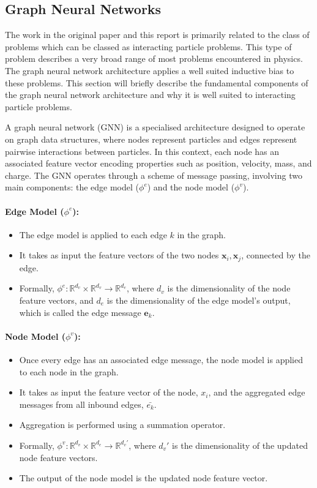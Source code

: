 \documentclass[11pt]{article}
\begin{document}
\subsection{Graph Neural Networks}
The work in the original paper and this report is primarily related to the class of problems which can be classed as interacting particle problems. This type of problem describes a very broad range of most problems encountered in physics. The graph neural network architecture applies a well suited inductive bias to these problems. This section will briefly describe the fundamental components of the graph neural network architecture and why it is well suited to interacting particle problems.

A graph neural network (GNN) is a specialised architecture designed to operate on graph data structures, where nodes represent particles and edges represent pairwise interactions between particles. In this context, each node has an associated feature vector encoding properties such as position, velocity, mass, and charge. The GNN operates through a scheme of message passing, involving two main components: the edge model ($\phi^e$) and the node model ($\phi^v$).
\paragraph*{Edge Model ($\phi^e$):}
   \begin{itemize}
       \item The edge model is applied to each edge $k$ in the graph.
       \item It takes as input the feature vectors of the two nodes $\mathbf{x}_i,\mathbf{x}_j$, connected by the edge.
       \item Formally, $\phi^e : \mathbb{R}^{d_v} \times \mathbb{R}^{d_v} \rightarrow \mathbb{R}^{d_e}$, where $d_v$ is the dimensionality of the node feature vectors, and $d_e$ is the dimensionality of the edge model's output, which is called the edge message $\mathbf{e}_k$.
   \end{itemize}

\paragraph*{Node Model ($\phi^v$):}
   \begin{itemize}
       \item Once every edge has an associated edge message, the node model is applied to each node in the graph.
       \item It takes as input the feature vector of the node, $x_i$, and the aggregated edge messages from all inbound edges, $\bar{e_k}$.
       \item Aggregation is performed using a summation operator.
       \item Formally, $\phi^v : \mathbb{R}^{d_v} \times \mathbb{R}^{d_e} \rightarrow \mathbb{R}^{d_v'}$, where $d_v'$ is the dimensionality of the updated node feature vectors.
       \item The output of the node model is the updated node feature vector.
   \end{itemize}
\end{document}
